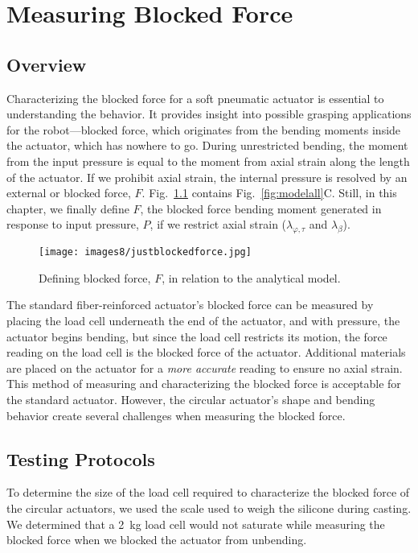 \chapter{Measuring Blocked Force}
\label{chapter:blockedforce}

\section{Overview}
Characterizing the blocked force for a soft pneumatic actuator is essential to understanding the behavior. It provides insight into possible grasping applications for the robot—blocked force, which originates from the bending moments inside the actuator, which has nowhere to go. During unrestricted bending, the moment from the input pressure is equal to the moment from axial strain along the length of the actuator. If we prohibit axial strain, the internal pressure is resolved by an external or blocked force, $F$. Fig.~\ref{fig:justblockedforce} contains Fig.~\ref{fig:modelall}C. Still, in this chapter, we finally define $F$, the blocked force bending moment generated in response to input pressure, $P$, if we restrict axial strain ($\lambda_{\varphi,\tau}$ and $\lambda_\beta$). 

\begin{figure}[ht]
    \centering
     \texttt{[image: images8/justblockedforce.jpg]}
    \caption{Defining blocked force, $F$, in relation to the analytical model.}
    \label{fig:justblockedforce}
\end{figure}

The standard fiber-reinforced actuator's blocked force can be measured by placing the load cell underneath the end of the actuator, and with pressure, the actuator begins bending, but since the load cell restricts its motion, the force reading on the load cell is the blocked force of the actuator. Additional materials are placed on the actuator for a \emph{more accurate} reading to ensure no axial strain. This method of measuring and characterizing the blocked force is acceptable for the standard actuator. However, the circular actuator's shape and bending behavior create several challenges when measuring the blocked force. 

\section{Testing Protocols}

To determine the size of the load cell required to characterize the blocked force of the circular actuators, we used the scale used to weigh the silicone during casting. We determined that a 2~kg load cell would not saturate while measuring the blocked force when we blocked the actuator from unbending. 

